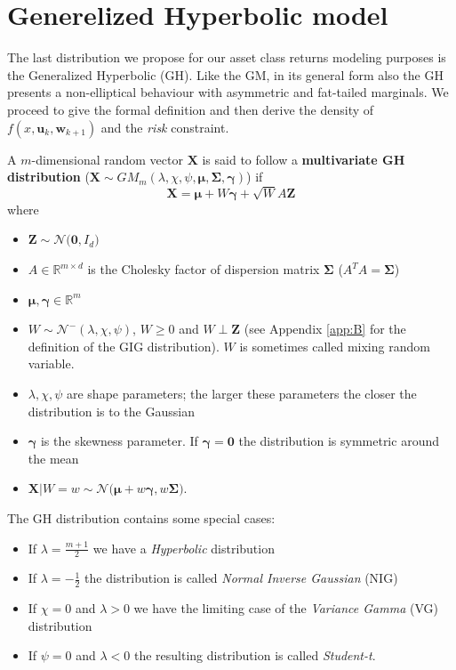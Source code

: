 \section{Generelized Hyperbolic model}
The last distribution we propose for our asset class returns modeling purposes is the Generalized Hyperbolic (GH). Like the GM, in its general form also the GH presents a non-elliptical behaviour with asymmetric and fat-tailed marginals. We proceed to give the formal definition and then derive the density of $f(x,\bm{u}_k,\bm{w}_{k+1})$
and the \textit{risk} constraint.
\begin{definition}[GH distribution]\label{def:GH}
	A $m$-dimensional random vector $\bm{X}$ is said to follow a \textbf{multivariate GH distribution} ($\bm{X} \sim GM_m(\lambda,\chi,\psi,\bm{\mu},\bm{\Sigma},\bm{\gamma})$) if \[ \bm{X} = \bm{\mu}+W\bm{\gamma}+\sqrt{W}A\bm{Z} \] where 
	\begin{itemize}
		\item $\bm{Z} \sim \mathcal{N}\big(\bm{0},I_d\big)$
		\item $A \in \mathbb{R}^{m \times d} $ is the Cholesky factor of dispersion matrix $\bm{\Sigma}$ ($A^TA = \bm{\Sigma}$)
		\item $\bm{\mu}, \bm{\gamma} \in \mathbb{R}^m$
		\item $W \sim \mathcal{N}^-(\lambda,\chi,\psi)$, $W \geq 0$ and $W \perp \bm{Z}$ (see Appendix \ref{app:B} for the definition of the GIG distribution). $W$ is sometimes called mixing random variable.
	\end{itemize}
\end{definition}
\begin{remark}
	\begin{itemize}
		\item $\lambda,\chi,\psi$ are shape parameters; the larger these parameters the closer the distribution is to the Gaussian
		\item $\bm{\gamma}$ is the skewness parameter. If $\bm{\gamma}= \bm{0}$ the distribution is symmetric around the mean
		\item $\bm{X}\lvert W = w \sim \mathcal{N}\big(\bm{\mu}+w\bm{\gamma},w\bm{\Sigma}\big)$.
	\end{itemize}
\end{remark}
The GH distribution contains some special cases:
\begin{itemize}
	\item If $\lambda=\frac{m+1}{2}$ we have a \textit{Hyperbolic} distribution
	\item If $\lambda=-\frac{1}{2}$ the distribution is called \textit{Normal Inverse Gaussian} (NIG)
	\item If $\chi = 0$ and $\lambda > 0$ we have the limiting case of the \textit{Variance Gamma} (VG) distribution
	\item If $\psi = 0$ and $\lambda < 0$ the resulting distribution is called \textit{Student-t}.
\end{itemize}
	
